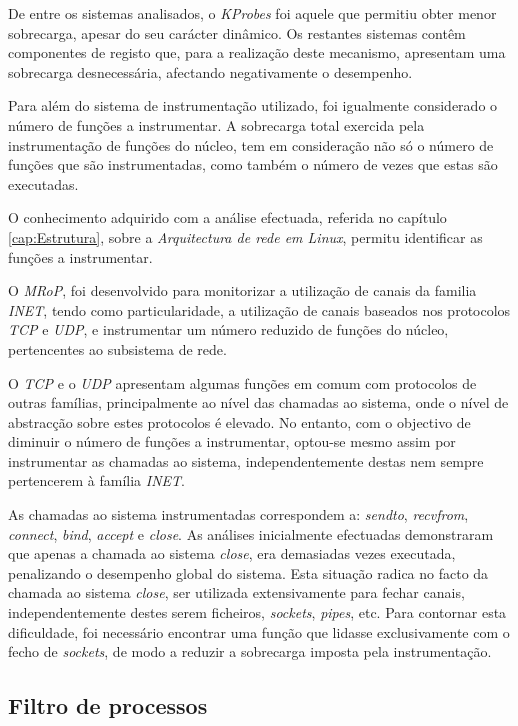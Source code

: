 De entre os sistemas analisados, o \textit{KProbes} foi aquele que permitiu obter menor sobrecarga, apesar do seu carácter dinâmico.
Os restantes sistemas contêm componentes de registo que, para a realização deste mecanismo, apresentam uma sobrecarga desnecessária, afectando negativamente o desempenho.

Para além do sistema de instrumentação utilizado, foi igualmente considerado o número de funções a instrumentar.
A sobrecarga total exercida pela instrumentação de funções do núcleo, tem em consideração não só o número de funções que são instrumentadas, como também o número de vezes que estas são executadas.

O conhecimento adquirido com a análise efectuada, referida no capítulo \ref{cap:Estrutura}, sobre a \textit{Arquitectura de rede em Linux}, permitu identificar as funções a instrumentar.

O \textit{MRoP}, foi desenvolvido para monitorizar a utilização de canais da familia \textit{INET}, tendo como particularidade, a utilização de canais baseados nos protocolos \textit{TCP} e \textit{UDP}, e instrumentar um número reduzido de funções do núcleo, pertencentes ao subsistema de rede.

O \textit{TCP} e o \textit{UDP} apresentam algumas funções em comum com protocolos de outras famílias, principalmente ao nível das chamadas ao sistema, onde o nível de abstracção sobre estes protocolos é elevado.
No entanto, com o objectivo de diminuir o número de funções a instrumentar, optou-se mesmo assim por instrumentar as chamadas ao sistema, independentemente destas nem sempre pertencerem à família \textit{INET}.

As chamadas ao sistema instrumentadas correspondem a: \textit{sendto}, \textit{recvfrom}, \textit{connect}, \textit{bind}, \textit{accept} e \textit{close}.
As análises inicialmente efectuadas demonstraram que apenas a chamada ao sistema \textit{close}, era demasiadas vezes executada, penalizando o desempenho global do sistema.
Esta situação radica no facto da chamada ao sistema \textit{close}, ser utilizada extensivamente para fechar canais, independentemente destes serem ficheiros, \textit{sockets}, \textit{pipes}, etc.
Para contornar esta dificuldade, foi necessário encontrar uma função que lidasse exclusivamente com o fecho de \textit{sockets}, de modo a reduzir a sobrecarga imposta pela instrumentação.



\subsection{Filtro de processos}

